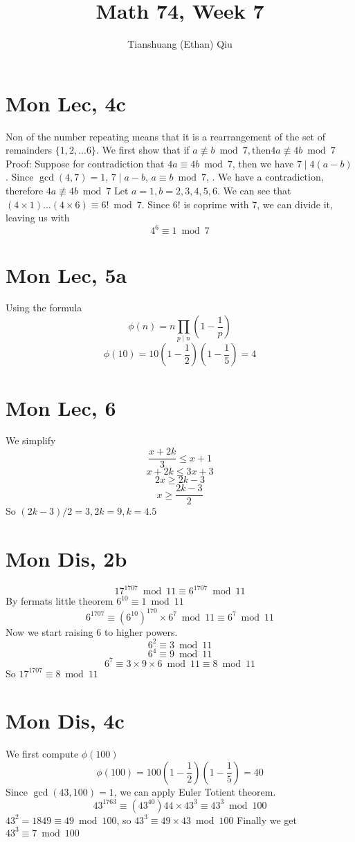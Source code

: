 \documentclass[12pt]{article}
\author{Tianshuang (Ethan) Qiu}
\begin{document}
\title{Math 74, Week 7}
\maketitle

\section{Mon Lec, 4c}
Non of the number repeating means that it is a rearrangement of the set of remainders $\{1,2,...6\}$. We first show that if $a \not \equiv b \bmod 7, \text{then} 4a \not \equiv 4b \bmod 7$
\newline
Proof:
Suppose for contradiction that $4a \equiv 4b \bmod 7$, then we have $7 \mid 4(a-b)$. Since $\gcd(4,7)=1$, $7 \mid a-b$, $a \equiv b \bmod 7$, \lightning. We have a contradiction, therefore $4a \not \equiv 4b \bmod 7$
\newline
Let $a=1, b = 2,3,4,5,6$. We can see that $(4 \times 1)...(4 \times 6) \equiv 6! \bmod 7$. Since 6! is coprime with 7, we can divide it, leaving us with
$$4^6 \equiv 1 \bmod 7$$

\section{Mon Lec, 5a}
Using the formula
$$\phi(n) = n \prod _{p \mid n}(1-\frac{1}{p})$$
$$\phi(10) = 10(1-\frac{1}{2})(1-\frac{1}{5}) = 4$$

\section{Mon Lec, 6}
We simplify
$$\frac{x+2k}{3} \leq x+1$$
$$x+2k \leq 3x+3$$
$$2x \geq 2k-3$$
$$x \geq \frac{2k-3}{2}$$
So $(2k-3)/2 = 3, 2k = 9, k = 4.5$
\newpage


\section{Mon Dis, 2b}
$$17 ^ {1707} \bmod 11 \equiv 6^{1707}\bmod 11$$
By fermats little theorem $6^{10} \equiv 1 \bmod 11$
$$6^{1707} \equiv (6^{10})^{170} \times 6^7 \bmod 11 \equiv 6^7 \bmod 11$$
Now we start raising 6 to higher powers.
$$6^2 \equiv 3 \bmod 11$$
$$6^4 \equiv 9 \bmod 11$$
$$6^7 \equiv 3\times9\times6 \bmod 11 \equiv 8 \bmod 11$$
So $17 ^ {1707} \equiv 8 \bmod 11$

\section{Mon Dis, 4c}
We first compute $\phi(100)$
$$\phi(100)=100(1-\frac{1}{2})(1-\frac{1}{5}) = 40$$
Since $\gcd(43,100)=1$, we can apply Euler Totient theorem.
$$43^{1763} \equiv (43^{40}){44} \times 43^3 \equiv 43^3 \bmod 100$$
$43^2 = 1849 \equiv 49 \bmod 100$, so $43^3 \equiv 49 \times 43 \bmod 100$
Finally we get $43^3 \equiv 7 \bmod 100$
\newpage
\end{document}
